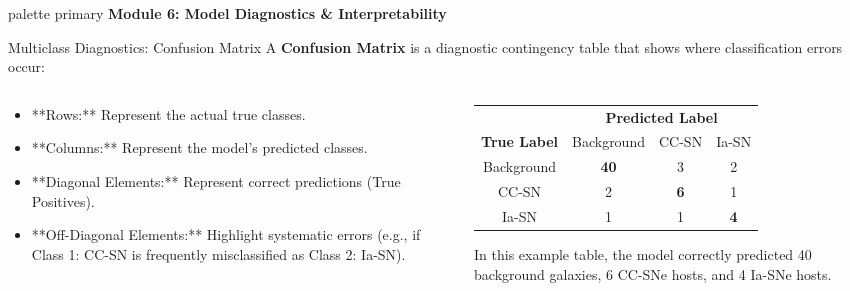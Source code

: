 \documentclass[9pt]{beamer}
\begin{document}
\begin{frame}[plain]
  \vfill
  \centering
  \begin{beamercolorbox}[sep=8pt,center,shadow=true,rounded=true]{palette primary}
    \textbf{Module 6: Model Diagnostics \& Interpretability}
  \end{beamercolorbox}
  \vfill
\end{frame}

\begin{frame}{Multiclass Diagnostics: Confusion Matrix}
  A \textbf{Confusion Matrix} is a diagnostic contingency table that shows where classification errors occur:
  \begin{columns}
    \begin{column}{0.5\textwidth}
      \begin{itemize}
        \item **Rows:** Represent the actual true classes.
        \item **Columns:** Represent the model's predicted classes.
        \item **Diagonal Elements:** Represent correct predictions (True Positives).
        \item **Off-Diagonal Elements:** Highlight systematic errors (e.g., if Class 1: CC-SN is frequently misclassified as Class 2: Ia-SN).
      \end{itemize}
    \end{column}
    \begin{column}{0.5\textwidth}
      \begin{center}
        \begin{tabular}{c c c c}
          \toprule
          & \multicolumn{3}{c}{\textbf{Predicted Label}} \\
          \textbf{True Label} & Background & CC-SN & Ia-SN \\
          \midrule
          Background & \textbf{40} & 3 & 2 \\
          CC-SN & 2 & \textbf{6} & 1 \\
          Ia-SN & 1 & 1 & \textbf{4} \\
          \bottomrule
        \end{tabular}
      \end{center}
      In this example table, the model correctly predicted 40 background galaxies, 6 CC-SNe hosts, and 4 Ia-SNe hosts.
    \end{column}
  \end{columns}
\end{frame}
\end{document}
